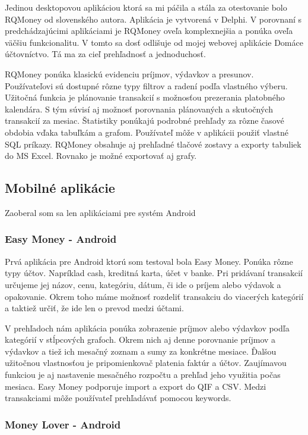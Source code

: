 \documentclass[12pt,oneside]{book}
\begin{document}
Jedinou desktopovou aplikáciou ktorá sa mi páčila a stála za otestovanie bolo RQMoney od slovenského autora. Aplikácia je vytvorená v Delphi. V porovnaní s predchádzajúcimi aplikáciami je RQMoney oveľa komplexnejšia a ponúka oveľa väčšiu funkcionalitu. V tomto sa dosť odlišuje od mojej webovej aplikácie Domáce účtovníctvo. Tá ma za cieľ prehľadnosť a jednoduchosť. 

RQMoney ponúka klasickú evidenciu príjmov, výdavkov a presunov. Používateľovi sú dostupné rôzne typy filtrov a radení podľa vlastného výberu. Užitočná funkcia je plánovanie transakcií s možnosťou prezerania platobného kalendára. S tým súvisí aj možnosť porovnania plánovaných a skutočných transakcií za mesiac. Štatistiky ponúkajú podrobné prehľady za rôzne časové obdobia vďaka tabuľkám a grafom. Používateľ môže v aplikácii použiť vlastné SQL príkazy. RQMoney obsahuje aj prehľadné tlačové zostavy a exporty tabuliek do MS Excel. Rovnako je možné exportovať aj grafy. 

\subsection{Mobilné aplikácie}
Zaoberal som sa len aplikáciami pre systém Android
\subsubsection{Easy Money - Android \cite{EasyMoney}\ }

Prvá aplikácia pre Android ktorú som testoval bola Easy Money. Ponúka rôzne typy účtov. Napríklad cash, kreditná karta, účet v banke. Pri pridávaní transakcií určujeme jej názov, cenu, kategóriu, dátum, či ide o príjem alebo výdavok a opakovanie. Okrem toho máme možnosť rozdeliť transakciu do viacerých kategórií a taktiež určiť, že ide len o prevod medzi účtami. 

V prehľadoch nám aplikácia ponúka zobrazenie príjmov alebo výdavkov podľa kategórií v stĺpcových grafoch. Okrem nich aj denne porovnanie príjmov a výdavkov a tiež ich mesačný zoznam a sumy za konkrétne mesiace. Ďalšou užitočnou vlastnosťou je pripomienkovač platenia faktúr a účtov. Zaujímavou funkciou je aj nastavenie mesačného rozpočtu a prehľad jeho využitia počas mesiaca. Easy Money podporuje import a export do QIF a CSV.  Medzi transakciami môže používateľ prehľadávať pomocou keywords.

\subsubsection{Money Lover - Android \cite{MoneyLover}\ }
\end{document}
